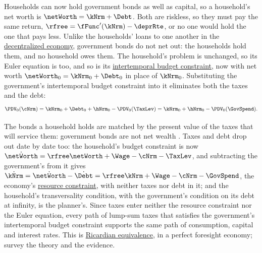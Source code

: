 \documentclass{econark}
\begin{document}
Households can now hold government bonds as well as capital, so a household's net worth is $\netWorth = \kNrm + \Debt$. Both are riskless, so they must pay the same return, $\rfree = \fFunc^{\prime}(\kNrm)-\deprRte$, or no one would hold the one that pays less. Unlike the households' loans to one another in the \href{https://intertemporal-choice.github.io/content/growth/decentralizingrck/}{decentralized economy}, government bonds do not net out: the households hold them, and no household owes them. The household's problem is unchanged, so its Euler equation is too, and so is its \hyperref[eq:RCKGov-hhibc]{intertemporal budget constraint}, now with net worth $\netWorth_{0} = \kNrm_{0} + \Debt_{0}$ in place of $\kNrm_{0}$. Substituting the government's intertemporal budget constraint into it eliminates both the taxes and the debt:
\begin{equation}
  \PDV_{0}(\cNrm) = \kNrm_{0} + \Debt_{0} + \hNrm_{0} - \PDV_{0}(\TaxLev) = \kNrm_{0} + \hNrm_{0} - \PDV_{0}(\GovSpend) . \label{eq:famibc}
\end{equation}

The bonds a household holds are matched by the present value of the taxes that will service them: government bonds are not net wealth \citep{barro:bondsnetworth}. Taxes and debt drop out date by date too: the household's budget constraint is now $\dot{\netWorth} = \rfree\netWorth + \Wage - \cNrm - \TaxLev$, and subtracting the government's from it gives $\dot{\kNrm} = \dot{\netWorth} - \dot{\Debt} = \rfree\kNrm + \Wage - \cNrm - \GovSpend$, the economy's \hyperref[eq:RCKGov-kdot]{resource constraint}, with neither taxes nor debt in it; and the household's transversality condition, with the government's condition on its debt at infinity, is the planner's. Since taxes enter neither the resource constraint nor the Euler equation, every path of lump-sum taxes that satisfies the government's intertemporal budget constraint supports the same path of consumption, capital and interest rates. This is \href{https://en.wikipedia.org/wiki/Ricardian_equivalence}{Ricardian equivalence}, in a perfect foresight economy; \citet{elmendorfMankiw} survey the theory and the evidence.
\end{document}
